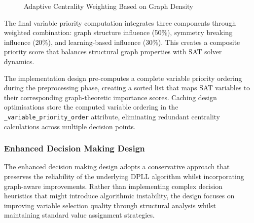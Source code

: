 \begin{figure}[htbp]
\centering
{}
\caption{Adaptive Centrality Weighting Based on Graph Density}
\label{fig:adaptive-weighting}
\end{figure}

The final variable priority computation integrates three components through weighted combination: graph structure influence (50\%), symmetry breaking influence (20\%), and learning-based influence (30\%). This creates a composite priority score that balances structural graph properties with SAT solver dynamics.

The implementation design pre-computes a complete variable priority ordering during the preprocessing phase, creating a sorted list that maps SAT variables to their corresponding graph-theoretic importance scores. Caching design optimisations store the computed variable ordering in the \texttt{\_variable\_priority\_order} attribute, eliminating redundant centrality calculations across multiple decision points.

\subsubsection{Enhanced Decision Making Design}

The enhanced decision making design adopts a conservative approach that preserves the reliability of the underlying DPLL algorithm whilst incorporating graph-aware improvements. Rather than implementing complex decision heuristics that might introduce algorithmic instability, the design focuses on improving variable selection quality through structural analysis whilst maintaining standard value assignment strategies.


